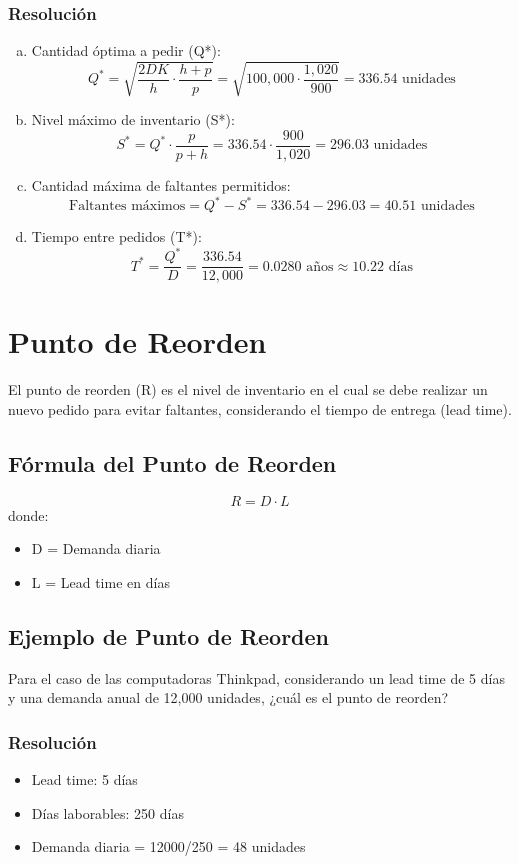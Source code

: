 \documentclass[11pt,a4paper]{article}
\begin{document}
\subsubsection{Resolución}
\begin{enumerate}[a.]
    \item Cantidad óptima a pedir (Q*):
    \[ Q^* = \sqrt{\frac{2DK}{h} \cdot \frac{h + p}{p}} = \sqrt{100{,}000 \cdot \frac{1{,}020}{900}} = 336.54 \text{ unidades} \]
    
    \item Nivel máximo de inventario (S*):
    \[ S^* = Q^* \cdot \frac{p}{p + h} = 336.54 \cdot \frac{900}{1{,}020} = 296.03 \text{ unidades} \]
    
    \item Cantidad máxima de faltantes permitidos:
    \[ \text{Faltantes máximos} = Q^* - S^* = 336.54 - 296.03 = 40.51 \text{ unidades} \]
    
    \item Tiempo entre pedidos (T*):
    \[ T^* = \frac{Q^*}{D} = \frac{336.54}{12{,}000} = 0.0280 \text{ años} \approx 10.22 \text{ días} \]
\end{enumerate}

\section{Punto de Reorden}
El punto de reorden (R) es el nivel de inventario en el cual se debe realizar un nuevo pedido para evitar faltantes, considerando el tiempo de entrega (lead time).

\subsection{Fórmula del Punto de Reorden}
\[ R = D \cdot L \]
donde:
\begin{itemize}
    \item D = Demanda diaria
    \item L = Lead time en días
\end{itemize}

\subsection{Ejemplo de Punto de Reorden}

Para el caso de las computadoras Thinkpad, considerando un lead time de 5 días y una demanda anual de 12,000 unidades, ¿cuál es el punto de reorden?

\subsubsection{Resolución}
\begin{itemize}
    \item Lead time: 5 días
    \item Días laborables: 250 días
    \item Demanda diaria = 12000/250 = 48 unidades
\end{itemize}
\end{document}
